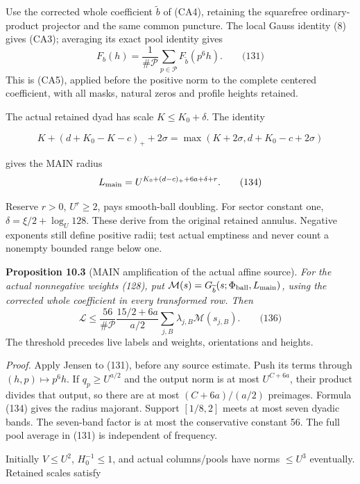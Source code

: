 Use the corrected whole coefficient \(\widetilde b\) of (CA4),
retaining the squarefree ordinary-product projector and the same common
puncture. The local Gauss identity (8) gives (CA3); averaging its exact
pool identity gives
\hypertarget{sr:amp-identity}{}\label{sr:amp-identity}
\[
 F_b(h)=\frac1{\#\mathcal P}
       \sum_{p\in\mathcal P}F_{\widetilde b}(p^6h).
 \qquad\text{(131)}
\]
This is (CA5), applied before the positive norm to the complete centered
coefficient, with all masks, natural zeros and profile heights retained.

The actual retained dyad has scale \(K\le K_0+\delta\). The identity

\[
K+(d+K_0-K-c)_++2\sigma
    =\max(K+2\sigma,d+K_0-c+2\sigma)
\]

gives the MAIN radius
\hypertarget{sr:main-radius}{}\label{sr:main-radius}
\[
 L_{\rm main}=U^{K_0+(d-c)_++6a+\delta+r}.
 \qquad\text{(134)}
\]

Reserve \(r>0\), \(U^r\ge2\), pays smooth-ball doubling. For sector constant one, \(\delta=\xi/2+\log_U128\). These derive from the original retained annulus. Negative exponents still define positive radii; test actual emptiness and never count a nonempty bounded range below one.

\textbf{Proposition 10.3} (MAIN amplification of the actual affine source).
\emph{\hypertarget{sr:affine-amplification}{}\label{sr:affine-amplification}
For the actual nonnegative weights (128), put
\(\mathcal M(s)=G_{\widetilde b}(s;\Phi_{\rm ball},L_{\rm main})\),
using the corrected whole coefficient in every transformed row. Then}
\hypertarget{sr:amplified-budget}{}\label{sr:amplified-budget}
\[
 \mathcal L\le\frac{56}{\#\mathcal P}
 \frac{15/2+6a}{a/2}\sum_{j,B}\lambda_{j,B}\mathcal M(s_{j,B}).
 \qquad\text{(136)}
\]
The threshold precedes live labels and weights, orientations and heights.

\emph{Proof.} Apply Jensen to (131), before any source estimate.
Push its terms through \((h,p)\mapsto p^6h\). If \(q_p\ge U^{a/2}\) and the output norm is at most
\(U^{C+6a}\), their product divides that output, so there are at most
\((C+6a)/(a/2)\) preimages. Formula (134) gives the radius majorant.
Support \([1/8,2]\) meets at most seven dyadic bands. The seven-band factor is at most the conservative constant 56.
The full pool average in (131) is independent of frequency.

Initially \(V\le U^2\), \(H_0^{-1}\le1\), and actual columns/pools have norms \(\le U^3\) eventually. Retained scales satisfy

